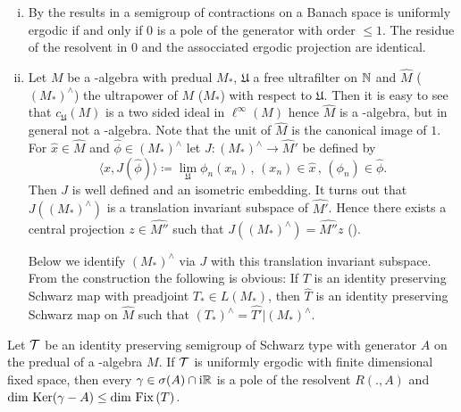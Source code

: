 \begin{remarks}\label{rem:d3-2.4}
\begin{enumerate}[(i), wide]
\item
By the results in \citet{lin:1974} a semigroup of contractions on a Banach space is uniformly ergodic if and only if $0$ is a pole of the generator with order $\leq 1$.
The residue of the resolvent in $0$ and the assocciated ergodic projection are identical.

\item
Let $M$ be a \WA-algebra with predual $M_{*}$, $\mathfrak{U}$ a free ultrafilter on $\mathbb{N} $ and $\widehat{M}$ (\resp  $(M_{*})^{\wedge}$) the ultrapower of $M$ (\resp  $M_{*}$) with respect to $\mathfrak{U}$.
Then it is easy to see that $c_{\mathfrak{U}}(M)$ is a two sided ideal in $\ell^{\infty}(M)$ hence $\widehat{M}$ is a \CA-algebra, but in general not a \WA-algebra.
Note that the unit of $\widehat{M}$ is the canonical image of $1$.
For $\hat{x} \in \hat{M}$ and $\hat{\phi} \in (M_{*})^{\wedge}$ let $J: (M_{*})^{\wedge} \to \widehat{M}'$ be defined by
\[
\langle x,J(\hat{\phi}) \rangle \coloneqq \lim_{\mathfrak{U}}\phi_{n}(x_{n}) \, , \, (x_{n}) \in \hat{x} \, , \, (\phi_{n}) \in \hat{\phi} .
\]
Then $J$ is well defined and an isometric embedding.
It turns out that $J((M_{*})^{\wedge})$ is a translation invariant subspace of $\widehat{M'}$.
Hence there exists a central projection $z \in \widehat{M''}$ such that $J((M_{*})^{\wedge}) = \widehat{M''}z$ (\citet[Proposition 2.2]{groh:1984b}).

Below we identify $(M_{*})^{\wedge}$ via $J$ with this translation invariant subspace.
From the construction the following is obvious: If $T$ is an identity preserving Schwarz map with preadjoint $T_{*} \in L(M_{*})$, then $\widehat{T}$ is an identity preserving Schwarz map on $\widehat{M}$ such that $(T_{*})^{\wedge} = \widehat{T'}|(M_{*})^{\wedge}$.
\end{enumerate}
\end{remarks}
\begin{theorem}\label{thm:d3-2.5}
Let $\mathcal{T}$ be an identity preserving semigroup of Schwarz type with generator $A$ on the predual of a \WA-algebra $M$.
If $\mathcal{T}$ is uniformly ergodic with finite dimensional fixed space, then every $\gamma \in \sigma(A) \cap \mathrm{i}\mathbb{R}$ is a pole of the resolvent $R(.,A)$ and $\dim \mathop{}\mathrm{Ker}(\gamma - A) \leq \dim \mathop{}\mathrm{Fix}\left(T\right)$.
\end{theorem}
